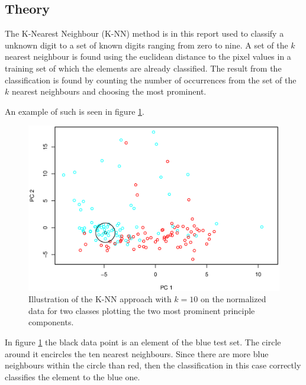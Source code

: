 \subsection{Theory}
The K-Nearest Neighbour (K-NN) method is in this report used to classify a unknown digit to a set of known digits ranging from zero to nine.
A set of the $k$ nearest neighbour is found using the euclidean distance to the pixel values in a training set of which the elements are already classified.
The result from the classification is found by counting the number of occurrences from the set of the $k$ nearest neighbours and choosing the most prominent.


An example of such is seen in figure \ref{fig:knn_illustration}.

\begin{figure}[H]
\centering
\includegraphics[width = 0.8 \textwidth]{graphics/knn_vis}
\caption[Illustration of the K-NN approach.]{Illustration of the K-NN approach with $k = 10$ on the normalized data for two classes plotting the two most prominent principle components.}
\label{fig:knn_illustration}
\end{figure}

In figure \ref{fig:knn_illustration} the black data point is an element of the blue test set.
The circle around it encircles the ten nearest neighbours.
Since there are more blue neighbours within the circle than red, then the classification in this case correctly classifies the element to the blue one.

